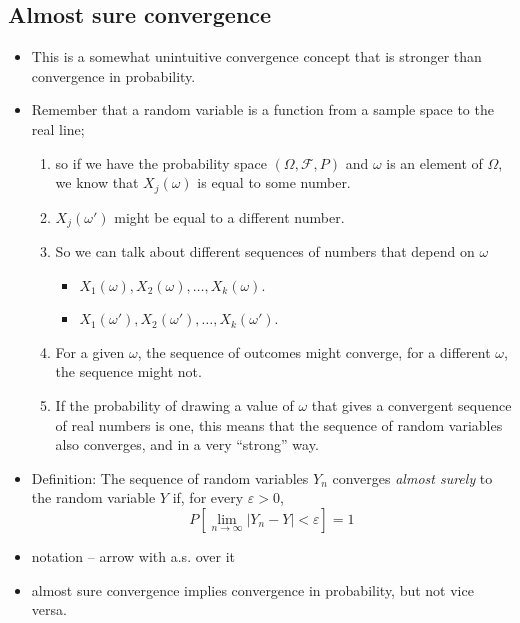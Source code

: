 \subsection{Almost sure convergence}
\begin{itemize}
\item This is a somewhat unintuitive convergence concept that is stronger
        than convergence in probability.
\item Remember that a random variable is a function from a sample space
        to the real line;
\begin{enumerate}
\item so if we have the probability space $(\Omega,
           \mathcal F, P)$ and $\omega$ is an element of $\Omega$, we know
           that $X_j(\omega)$ is equal to some number.
\item $X_j(\omega')$ might be equal to a different number.
\item So we can talk about different sequences of numbers that
           depend on $\omega$
\begin{itemize}
\item $X_1(\omega), X_2(\omega), \dots, X_k(\omega)$.
\item $X_1(\omega'), X_2(\omega'), \dots, X_k(\omega')$.
\end{itemize}
\item For a given $\omega$, the sequence of outcomes might
           converge, for a different $\omega$, the sequence might not.
\item If the probability of drawing a value of $\omega$ that gives a
           convergent sequence of real numbers is one, this means that
           the sequence of random variables also converges, and in a very
           ``strong'' way.
\end{enumerate}
\item Definition: The sequence of random variables $Y_n$ converges
        \emph{almost surely} to the random variable $Y$ if, for every
        $\varepsilon > 0$, \[ P[\lim_{n \to \infty} | Y_n - Y | <
        \varepsilon] = 1 \]
\item notation -- arrow with a.s. over it
\item almost sure convergence implies convergence in probability, but
        not vice versa.
\end{itemize}

